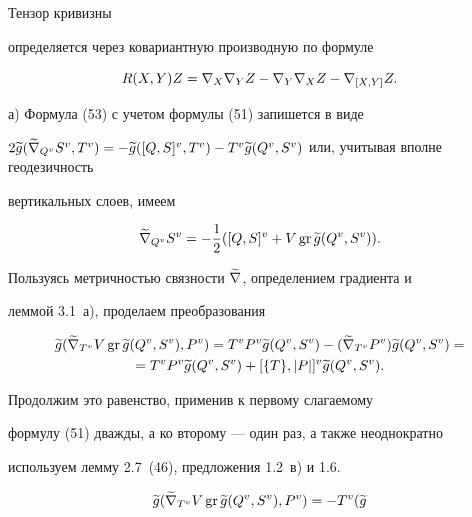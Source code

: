 \begin{pf} Тензор кривизны


определяется через ковариантную производную по формуле


\begin{equation}




R(X,Y)Z=\n{X}{\n{Y}{Z}}-\n{Y}{\n{X}{Z}}-\n{[X,Y]}{Z}.


\end{equation}





а) Формула (53) с учетом формулы (51) запишется в виде


$2\g{g}(\grn{\gv{Q}}{\gv{S}},\gv{T})=-\g{g}(\gv{[Q,S]},\gv{T})-


\gv{T}\g{g}(\gv{Q},\gv{S})$ или, учитывая вполне геодезичность


вертикальных слоев, имеем


\begin{equation}




\grn{\gv{Q}}{\gv{S}}=-\1(\gv{[Q,S]}+V\gr \g{g}(\gv{Q},\gv{S})).


\end{equation}


Пользуясь метричностью связности $\widetilde {\nabla}$, определением градиента и


леммой 3.1~а), проделаем преобразования


\begin{multline*}


\g{g}(\grn{\gv{T}}{V\gr \g{g}(\gv{Q},\gv{S})},\gv{P})=\gv{T}\gv{P}


\g{g}(\gv{Q},\gv{S})-(\grn{\gv{T}}{\gv{P}})\g{g}(\gv{Q},\gv{S})=\\


=\gv{T}\gv{P}\g{g}(\gv{Q},\gv{S})+\gv{[\{T\},|P|]}\g{g}(\gv{Q},\gv{S}).


\end{multline*}


Продолжим это равенство, применив к первому слагаемому


формулу (51) дважды, а ко второму --- один раз, а также неоднократно


используем лемму 2.7~(46), предложения 1.2~в) и 1.6.


\begin{multline*}


\g{g}(\grn{\gv{T}}{V\gr \g{g}(\gv{Q},\gv{S})},\gv{P})=-\gv{T}(\g{g}



\end{multline*}
\end{pf}
